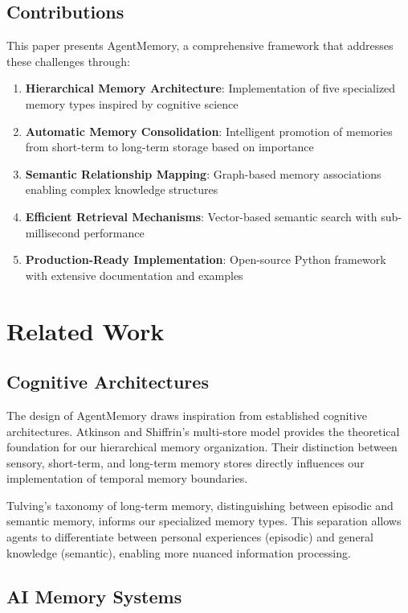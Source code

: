 \documentclass[journal]{IEEEtran}
\begin{document}
\subsection{Contributions}

This paper presents AgentMemory, a comprehensive framework that addresses these challenges through:

\begin{enumerate}
\item \textbf{Hierarchical Memory Architecture}: Implementation of five specialized memory types inspired by cognitive science
\item \textbf{Automatic Memory Consolidation}: Intelligent promotion of memories from short-term to long-term storage based on importance
\item \textbf{Semantic Relationship Mapping}: Graph-based memory associations enabling complex knowledge structures
\item \textbf{Efficient Retrieval Mechanisms}: Vector-based semantic search with sub-millisecond performance
\item \textbf{Production-Ready Implementation}: Open-source Python framework with extensive documentation and examples
\end{enumerate}

\section{Related Work}

\subsection{Cognitive Architectures}

The design of AgentMemory draws inspiration from established cognitive architectures. Atkinson and Shiffrin's \cite{atkinson1968} multi-store model provides the theoretical foundation for our hierarchical memory organization. Their distinction between sensory, short-term, and long-term memory stores directly influences our implementation of temporal memory boundaries.

Tulving's \cite{tulving1972} taxonomy of long-term memory, distinguishing between episodic and semantic memory, informs our specialized memory types. This separation allows agents to differentiate between personal experiences (episodic) and general knowledge (semantic), enabling more nuanced information processing.

\subsection{AI Memory Systems}
\end{document}
